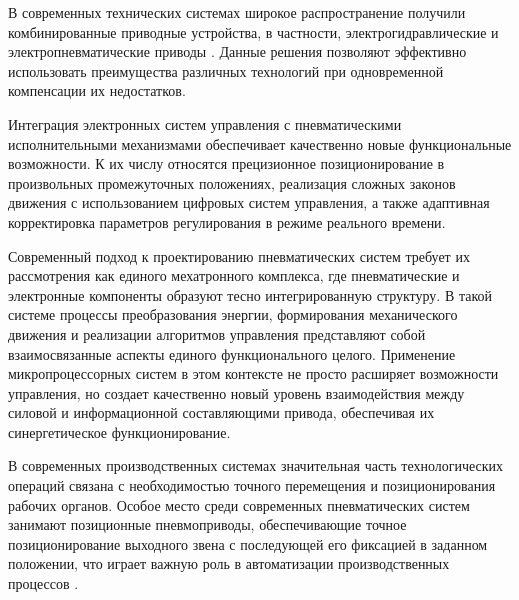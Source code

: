 В современных технических системах широкое распространение получили комбинированные приводные
устройства, в частности, электрогидравлические и электропневматические приводы \cite{рабинович1973системы,трофимов:a}.
Данные решения позволяют эффективно использовать преимущества различных технологий при одновременной компенсации их недостатков.

Интеграция электронных систем управления с пневматическими исполнительными
механизмами обеспечивает качественно новые функциональные возможности. К их числу
относятся прецизионное позиционирование в произвольных промежуточных положениях,
реализация сложных законов движения с использованием цифровых систем управления, а
также адаптивная корректировка параметров регулирования в режиме реального времени\cite{salim2011control,situm2013control}.

Современный подход к проектированию пневматических систем требует их рассмотрения как единого
мехатронного комплекса, где пневматические и электронные компоненты образуют тесно интегрированную
структуру. В такой системе процессы преобразования энергии, формирования
механического движения и реализации алгоритмов управления представляют собой взаимосвязанные
аспекты единого функционального целого. Применение микропроцессорных систем в этом
контексте не просто расширяет возможности управления, но создает качественно новый уровень
взаимодействия между силовой и информационной составляющими привода, обеспечивая их
синергетическое функционирование\cite{safuan2010microcontroller, vladur2016dynamic, lababidi2023position}.

В современных производственных системах значительная часть технологических операций связана с необходимостью точного
перемещения и позиционирования рабочих органов. Особое место среди современных пневматических систем занимают позиционные
пневмоприводы, обеспечивающие точное позиционирование выходного звена с последующей его фиксацией в
заданном положении, что играет важную роль в автоматизации производственных процессов \cite{papoutsidakis2007control,qiu2024position}.
